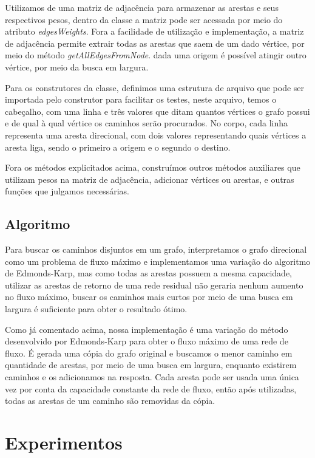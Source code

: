 Utilizamos de uma matriz de adjacência para armazenar as arestas e seus respectivos pesos, dentro da classe a matriz pode ser acessada por meio do atributo \textit{edgesWeights}. Fora a facilidade de utilização e implementação, a matriz de adjacência permite extrair todas as arestas que saem de um dado vértice, por meio do método \textit{getAllEdgesFromNode}. dada uma origem é possível atingir outro vértice, por meio da busca em largura.

Para os construtores da classe, definimos uma estrutura de arquivo que pode ser importada pelo construtor para facilitar os testes, neste arquivo, temos o cabeçalho, com uma linha e três valores que ditam quantos vértices o grafo possui e de qual à qual vértice os caminhos serão procurados. No corpo, cada linha representa uma aresta direcional, com dois valores representando quais vértices a aresta liga, sendo o primeiro a origem e o segundo o destino.

Fora os métodos explicitados acima, construímos outros métodos auxiliares que utilizam pesos na matriz de adjacência, adicionar vértices ou arestas, e outras funções que julgamos necessárias.

\subsection{\esp Algoritmo} \label{sec:algoritmo}

Para buscar os caminhos disjuntos em um grafo, interpretamos o grafo direcional como um problema de fluxo máximo e implementamos uma variação do algoritmo de Edmonds-Karp, mas como todas as arestas possuem a mesma capacidade, utilizar as arestas de retorno de uma rede residual não geraria nenhum aumento no fluxo máximo, buscar os caminhos mais curtos por meio de uma busca em largura é suficiente para obter o resultado ótimo.

Como já comentado acima, nossa implementação é uma variação do método desenvolvido por Edmonds-Karp para obter o fluxo máximo de uma rede de fluxo. É gerada uma cópia do grafo original e buscamos o menor caminho em quantidade de arestas, por meio de uma busca em largura, enquanto existirem caminhos e os adicionamos na resposta. Cada aresta pode ser usada uma única vez por conta da capacidade constante da rede de fluxo, então após utilizadas, todas as arestas de um caminho são removidas da cópia.

\section{\esp Experimentos} \label{sec:experimentos}

